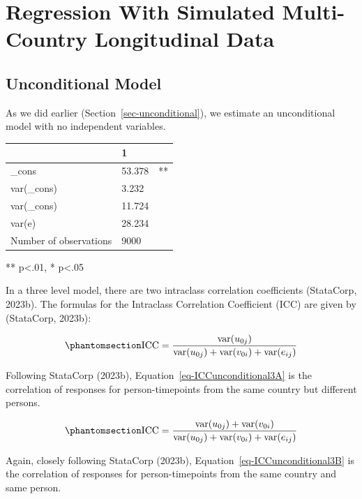 \documentclass[
  letterpaper,
  DIV=11,
  numbers=noendperiod]{scrreprt}
\begin{document}
\section{Regression With Simulated Multi-Country Longitudinal
Data}\label{sec-regressionlongitudinal}

\subsection{Unconditional Model}\label{sec-unconditional-longitudinal}

As we did earlier (Section~\ref{sec-unconditional}), we estimate an
unconditional model with no independent variables.

\begin{longtable}[]{@{}lll@{}}
\toprule\noalign{}
& 1 & \\
\midrule\noalign{}
\endhead
\bottomrule\noalign{}
\endlastfoot
\_cons & 53.378 & ** \\
var(\_cons) & 3.232 & \\
var(\_cons) & 11.724 & \\
var(e) & 28.234 & \\
Number of observations & 9000 & \\
\end{longtable}

** p\textless.01, * p\textless.05

In a three level model, there are two intraclass correlation
coefficients (StataCorp, 2023b).  The formulas for the
Intraclass Correlation Coefficient (ICC) are given by (StataCorp,
2023b):

\begin{equation}\phantomsection\label{eq-ICCunconditional3A}{\text{ICC} = \frac{\text{var}(u_{0j})}{\text{var}(u_{0j}) + \text{var}(v_{0i}) + \text{var}(e_{ij})}}\end{equation}

Following StataCorp (2023b), Equation~\ref{eq-ICCunconditional3A} is the
correlation of responses for person-timepoints from the same country but
different persons.

\begin{equation}\phantomsection\label{eq-ICCunconditional3B}{\text{ICC} = \frac{\text{var}(u_{0j}) + \text{var}(v_{0i})}{\text{var}(u_{0j}) + \text{var}(v_{0i}) + \text{var}(e_{ij})}}\end{equation}

Again, closely following StataCorp (2023b),
Equation~\ref{eq-ICCunconditional3B} is the correlation of responses for
person-timepoints from the same country and same person.
\end{document}
